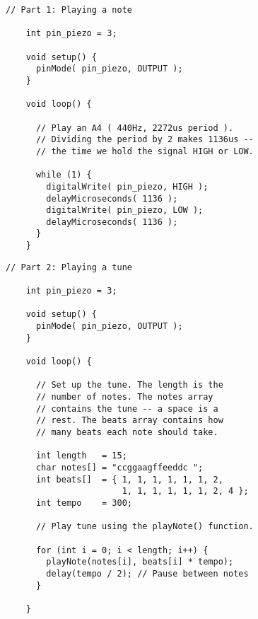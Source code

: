 \begin{minipage}[t]{0.49\tw}
  \vspace{0.1in}
  \begin{Verbatim}[gobble=3,fontsize=\small]
    // Part 1: Playing a note

    int pin_piezo = 3;

    void setup() {
      pinMode( pin_piezo, OUTPUT );
    }

    void loop() {

      // Play an A4 ( 440Hz, 2272us period ).
      // Dividing the period by 2 makes 1136us --
      // the time we hold the signal HIGH or LOW.

      while (1) {
        digitalWrite( pin_piezo, HIGH );
        delayMicroseconds( 1136 );
        digitalWrite( pin_piezo, LOW );
        delayMicroseconds( 1136 );
      }
    }
  \end{Verbatim}
  \vspace{0.1in}
  \begin{Verbatim}[gobble=3,fontsize=\small]
    // Part 2: Playing a tune

    int pin_piezo = 3;

    void setup() {
      pinMode( pin_piezo, OUTPUT );
    }

    void loop() {

      // Set up the tune. The length is the
      // number of notes. The notes array
      // contains the tune -- a space is a
      // rest. The beats array contains how
      // many beats each note should take.

      int length   = 15;
      char notes[] = "ccggaagffeeddc ";
      int beats[]  = { 1, 1, 1, 1, 1, 1, 2,
                       1, 1, 1, 1, 1, 1, 2, 4 };
      int tempo    = 300;

      // Play tune using the playNote() function.

      for (int i = 0; i < length; i++) {
        playNote(notes[i], beats[i] * tempo);
        delay(tempo / 2); // Pause between notes
      }

    }
  \end{Verbatim}
\end{minipage}
\vspace{0.1in}


